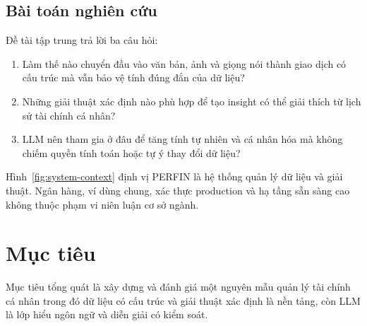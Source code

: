 \subsection{Bài toán nghiên cứu}

Đề tài tập trung trả lời ba câu hỏi:

\begin{enumerate}
  \item Làm thế nào chuyển đầu vào văn bản, ảnh và giọng nói thành giao dịch có cấu trúc mà vẫn bảo vệ tính đúng đắn của dữ liệu?
  \item Những giải thuật xác định nào phù hợp để tạo insight có thể giải thích từ lịch sử tài chính cá nhân?
  \item LLM nên tham gia ở đâu để tăng tính tự nhiên và cá nhân hóa mà không chiếm quyền tính toán hoặc tự ý thay đổi dữ liệu?
\end{enumerate}


Hình~\ref{fig:system-context} định vị PERFIN là hệ thống quản lý dữ liệu và giải thuật. Ngân hàng, ví dùng chung, xác thực production và hạ tầng sẵn sàng cao không thuộc phạm vi niên luận cơ sở ngành.

\section{Mục tiêu}

Mục tiêu tổng quát là xây dựng và đánh giá một nguyên mẫu quản lý tài chính cá nhân trong đó dữ liệu có cấu trúc và giải thuật xác định là nền tảng, còn LLM là lớp hiểu ngôn ngữ và diễn giải có kiểm soát.

